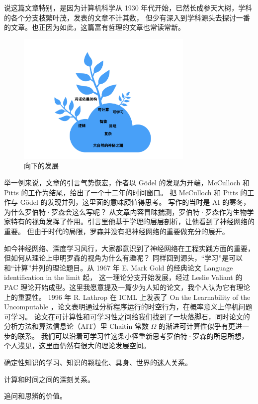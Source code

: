 \documentclass[a4paper,12pt]{article}
\begin{document}
说这篇文章特别，是因为计算机科学从 1930 年代开始，已然长成参天大树，学科的各个分支枝繁叶茂，发表的文章不计其数，
但少有深入到学科源头去探讨一番的文章。也正因为如此，这篇富有哲理的文章也常读常新。

\begin{figure}[ht]
\centering
\includegraphics[height=2.5in]{images/landscape.png}
\caption{向下的发展}
\end{figure}

举一例来说，文章的引言气势恢宏，作者以 G{\"o}del 的发现为开端，McCulloch 和 Pitts 的工作为结尾，给出了一个十二年的时间窗口。
把 McCulloch 和 Pitts 的工作与 G{\"o}del 的发现并列，这里面的意味颇值得思考。 写作的当时是 AI 的寒冬，为什么罗伯特·罗森会这么写呢？
从文章内容冒昧揣测，罗伯特·罗森作为生物学家特有的视角发挥了作用。引言里他基于学理的层层剖析，让他看到了神经网络的重要。
但由于时代的局限，罗森并没有把神经网络的重要做充分的展开。

如今神经网络、深度学习风行，大家都意识到了神经网络在工程实践方面的重要，但如何从理论上申明罗森的视角为什么有趣呢？
同样回到源头，“学习”是可以和“计算”并列的理论题目。从 1967 年 E. Mark Gold 的经典论文 Language identification in the limit 起，
这一理论分支开始发展，经过 Leslie Valiant 的 PAC 理论开始成型。这里我愿意提及一篇少为人知的论文，我个人认为它有理论上的重要性。
1996 年 R. Lathrop 在 ICML 上发表了 On the Learnability of the Uncomputable ，论文表明通过分析程序运行的时空行为，在概率意义上停机问题可学习。
论文在可计算性和可学习性之间给我们找到了一块落脚石，同时论文的分析方法和算法信息论（AIT）里 Chaitin 常数 $\Omega$ 的渐进可计算性似乎有更进一步的联系。
我们可以沿着可学习性这条小径重新思考罗伯特·罗森的所思所想，个人浅见，这里面仍然有很大的理论发展空间。

确定性知识的学习、知识的颗粒化、具身、世界的迷人关系。

计算和时间之间的深刻关系。

追问和思辨的价值。
\end{document}
